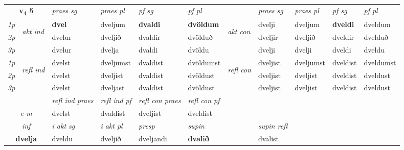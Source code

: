\noindent
\begin{tabular}{lllllllllll} \toprule
\multicolumn{2}{c}{\textbf{v{\textsubscript{4}}} \Large{\textbf{5}}}  &  \textit{praes sg}  & \textit{praes pl}  &\textit{ pf sg} & \textit{pf pl} &  &  \textit{praes sg}  & \textit{praes pl}  & \textit{pf sg} & \textit{pf pl } \\*
	\cmidrule{3-6} \cmidrule{8-11}
 {\textit{1p}} & \multirow{3}{*}{\begin{turn}{90}\textit{akt ind}\end{turn}} & \textbf{dvel} & dveljum & \textbf{dvaldi} & \textbf{dvöldum} & \multirow{3}{*}{\begin{turn}{90}\textit{akt con}\end{turn}} &dvelji & dveljum & \textbf{dveldi} & dveldum\\*
 {\textit{2p}} &  &  dvelur  & dveljið & dvaldir & dvölduð & & dveljir & dveljið & dveldir & dvelduð \\*
{\textit{3p}} &  & dvelur & dvelja & dvaldi & dvöldu & & dvelji & dvelji& dveldi & dveldu \\*
\cmidrule{3-6} \cmidrule{8-11}
 {\textit{1p}} & \multirow{3}{*}{\begin{turn}{90}\textit{refl ind}\end{turn}}  & dvelst & dveljumst & dvaldist & dvöldumst & \multirow{3}{*}{\begin{turn}{90}\textit{refl con}\end{turn}}  &dveljist & dveljumst & dveldist & dveldumst \\*
 {\textit{2p}} &  & dvelst & dveljist & dvaldist & dvöldust & &dveljist & dveljist & dveldist & dveldust \\*
 {\textit{3p}}  & & dvelst & dveljast & dvaldist & dvöldust & & dveljist & dveljist& dveldist & dveldust \\*
\cmidrule{3-6} \cmidrule{8-11}

 & & \textit{refl ind praes} & \textit{refl ind pf} & \textit{refl con praes} & \textit{refl con pf} \\*
 \multicolumn{2}{c}{ \textit{e-m} }& dvelst & dvaldist & dveljist & dveldist \\*

\cmidrule{3-8}
   \multicolumn{2}{c}{\textit{inf}}  & \textit{i akt sg} & \textit{i akt pl}   & \textit{presp} & \textit{supin} && \textit{supin refl}  \\*
  \multicolumn{2}{c}{\textbf{dvelja}} & dveldu  & dveljið   & dveljandi &  \textbf{dvalið} && dvalist  \\*
\end{tabular}

